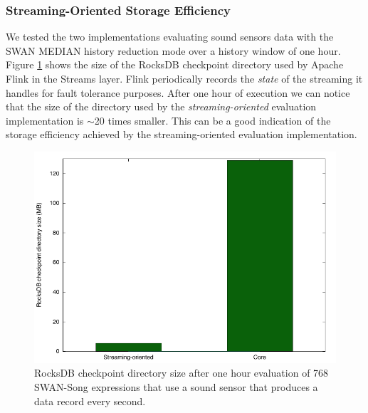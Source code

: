 \subsubsection{Streaming-Oriented Storage Efficiency}
We tested the two implementations evaluating sound sensors data with the SWAN MEDIAN history reduction mode over a history window of one hour. Figure \ref{fig:memory_consumption} shows the size of the RocksDB checkpoint directory used by Apache Flink in the Streams layer. Flink periodically records the \emph{state} of the streaming it handles for fault tolerance purposes. After one hour of execution we can notice that the size of the directory used by the \emph{streaming-oriented} evaluation implementation is $\sim$20 times smaller. This can be a good indication of the storage efficiency achieved by the streaming-oriented evaluation implementation.

 \begin{figure}[h!]
\includegraphics[width=1\textwidth]{images/memory_consumption.pdf}
 \caption{RocksDB checkpoint directory size after one hour evaluation of 768 SWAN-Song expressions that use a sound sensor that produces a data  record every second.}
\label{fig:memory_consumption}
\end{figure}

